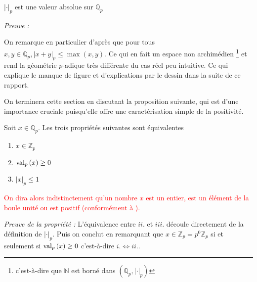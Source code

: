 \begin{propriete}
	$\left| \cdot  \right|_p$ est une valeur absolue sur $\mathbb{Q}_{p}$ 
\end{propriete}
\textit{Preuve :} 

On remarque en particulier d'après  que pour tous $x,y \in \mathbb{Q}_{p}, \left|x+y\right|_p \le \max\left( x,y \right)$. Ce qui en fait un espace non archimédien \footnote{c'est-à-dire que $\mathbb{N}$ est borné dans $\left( \mathbb{Q}_{p}, \left| \cdot \right|_p \right) $} et rend la géométrie $p$-adique très différente du cas réel peu intuitive. Ce qui explique le manque de figure et d'explications par le dessin dans la suite de ce rapport.

On terminera cette section en discutant la proposition suivante, qui est d'une importance cruciale puisqu'elle offre une caractérisation simple de la positivité.

\begin{proposition}
	Soit $x \in \mathbb{Q}_{p} $. Les trois propriétés suivantes sont équivalentes 
	\begin{enumerate}[label= \textit{\roman*}.]
		\item $x \in \mathbb{Z}_p$
		\item $\text{val}_p\left(x\right)\ge 0$
		\item $\left| x \right|_p\le 1$
	\end{enumerate}
\end{proposition}

\textcolor{red}{ On dira alors indistinctement qu'un nombre $x$ est un entier, est un élément de la boule unité ou est positif (conformément à ).}

\textit{ Preuve de la propriété : } L'équivalence entre $ii$. et $iii$. découle directement de la définition de $\left| \cdot  \right|_p$. Puis on conclut en remarquant que $x \in \mathbb{Z}_p = p^0 \mathbb{Z}_p$ si et seulement si $\text{val}_p\left(x\right)\ge 0$ c'est-à-dire $i. \iff ii.$.
